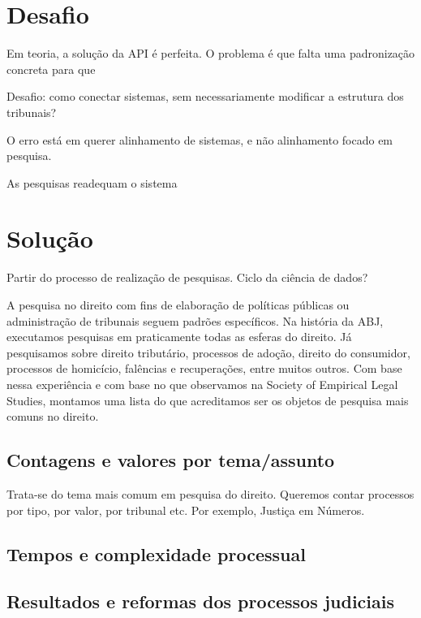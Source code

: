 \documentclass[]{report}
\begin{document}
\section{Desafio}\label{desafio}

Em teoria, a solução da API é perfeita. O problema é que falta uma
padronização concreta para que

Desafio: como conectar sistemas, sem necessariamente modificar a
estrutura dos tribunais?

O erro está em querer alinhamento de sistemas, e não alinhamento focado
em pesquisa.

As pesquisas readequam o sistema

\section{Solução}\label{solucao}

Partir do processo de realização de pesquisas. Ciclo da ciência de
dados?

A pesquisa no direito com fins de elaboração de políticas públicas ou
administração de tribunais seguem padrões específicos. Na história da
ABJ, executamos pesquisas em praticamente todas as esferas do direito.
Já pesquisamos sobre direito tributário, processos de adoção, direito do
consumidor, processos de homicício, falências e recuperações, entre
muitos outros. Com base nessa experiência e com base no que observamos
na Society of Empirical Legal Studies, montamos uma lista do que
acreditamos ser os objetos de pesquisa mais comuns no direito.

\subsection{Contagens e valores por
tema/assunto}\label{contagens-e-valores-por-temaassunto}

Trata-se do tema mais comum em pesquisa do direito. Queremos contar
processos por tipo, por valor, por tribunal etc. Por exemplo, Justiça em
Números.

\subsection{Tempos e complexidade
processual}\label{tempos-e-complexidade-processual}

\subsection{Resultados e reformas dos processos
judiciais}\label{resultados-e-reformas-dos-processos-judiciais}
\end{document}
